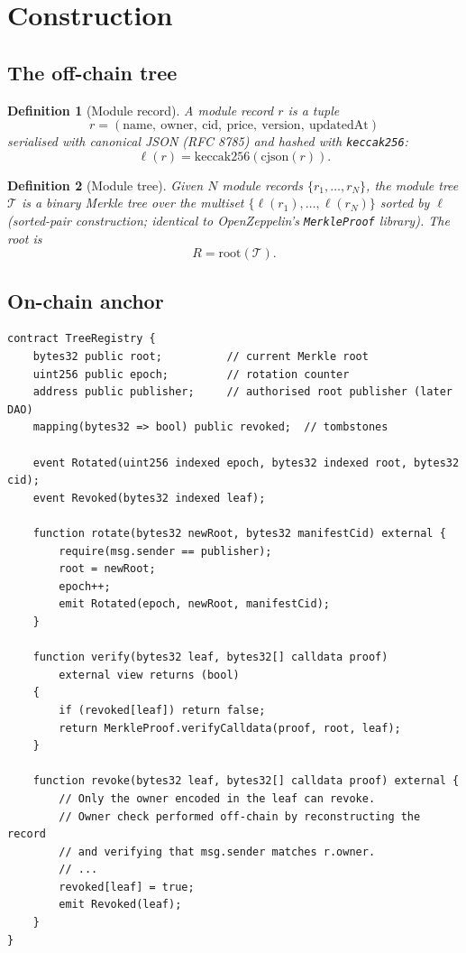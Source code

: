 \documentclass[11pt,a4paper]{article}
\newtheorem{definition}{Definition}[section]
\begin{document}
\section{Construction}

\subsection{The off-chain tree}

\begin{definition}[Module record]
A module record $r$ is a tuple
\[
r = (\text{name},\ \text{owner},\ \text{cid},\ \text{price},\ \text{version},\ \text{updatedAt})
\]
serialised with canonical JSON (RFC 8785) and hashed with \texttt{keccak256}:
\[
\ell(r) = \mathrm{keccak256}(\mathrm{cjson}(r)).
\]
\end{definition}

\begin{definition}[Module tree]
Given $N$ module records $\{r_1, \ldots, r_N\}$, the module tree $\mathcal{T}$ is a binary Merkle tree over the multiset $\{\ell(r_1), \ldots, \ell(r_N)\}$ sorted by $\ell$ (sorted-pair construction; identical to OpenZeppelin's \texttt{MerkleProof} library). The root is
\[
R = \mathrm{root}(\mathcal{T}).
\]
\end{definition}

\subsection{On-chain anchor}

\begin{lstlisting}[style=solidity]
contract TreeRegistry {
    bytes32 public root;          // current Merkle root
    uint256 public epoch;         // rotation counter
    address public publisher;     // authorised root publisher (later DAO)
    mapping(bytes32 => bool) public revoked;  // tombstones

    event Rotated(uint256 indexed epoch, bytes32 indexed root, bytes32 cid);
    event Revoked(bytes32 indexed leaf);

    function rotate(bytes32 newRoot, bytes32 manifestCid) external {
        require(msg.sender == publisher);
        root = newRoot;
        epoch++;
        emit Rotated(epoch, newRoot, manifestCid);
    }

    function verify(bytes32 leaf, bytes32[] calldata proof)
        external view returns (bool)
    {
        if (revoked[leaf]) return false;
        return MerkleProof.verifyCalldata(proof, root, leaf);
    }

    function revoke(bytes32 leaf, bytes32[] calldata proof) external {
        // Only the owner encoded in the leaf can revoke.
        // Owner check performed off-chain by reconstructing the record
        // and verifying that msg.sender matches r.owner.
        // ...
        revoked[leaf] = true;
        emit Revoked(leaf);
    }
}
\end{lstlisting}
\end{document}
